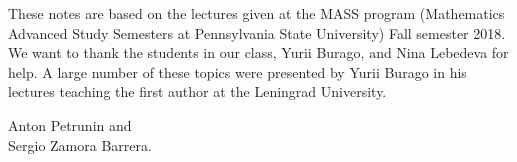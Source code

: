 These notes are based on the lectures given at the MASS program (Mathematics Advanced Study Semesters at Pennsylvania State University) Fall semester 2018.
We want to thank the students in our class, Yurii Burago, and Nina Lebedeva for help.
A large number of these topics were presented by Yurii Burago in his lectures teaching the first author at the Leningrad University.

\begin{flushright}
Anton Petrunin and\\
Sergio Zamora Barrera.
\end{flushright}




